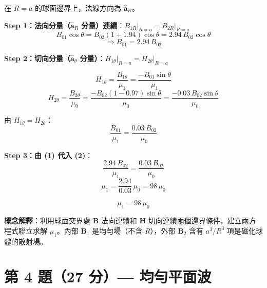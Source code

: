 \documentclass[12pt,a4paper]{article}
\newcommand{\vB}{\mathbf{B}}
\newcommand{\vH}{\mathbf{H}}
\newcommand{\aR}{\hat{\mathbf{a}}_R}
\newcommand{\ath}{\hat{\mathbf{a}}_\theta}
\begin{document}
\begin{solutionbox}[詳解]

在 $R = a$ 的球面邊界上，法線方向為 $\aR$。

\textbf{Step 1：法向分量（$\aR$ 分量）連續}：$B_{1R}\big|_{R=a} = B_{2R}\big|_{R=a}$
\[
  B_{01}\cos\theta = B_{02}\left(1 + 1.94\right)\cos\theta = 2.94\,B_{02}\cos\theta
\]
\[
  \Rightarrow B_{01} = 2.94\,B_{02}  \tag{1}
\]

\textbf{Step 2：切向分量（$\ath$ 分量）}：$H_{1\theta}\big|_{R=a} = H_{2\theta}\big|_{R=a}$

\[
  H_{1\theta} = \frac{B_{1\theta}}{\mu_1} = \frac{-B_{01}\sin\theta}{\mu_1}
\]
\[
  H_{2\theta} = \frac{B_{2\theta}}{\mu_0} = \frac{-B_{02}(1 - 0.97)\sin\theta}{\mu_0}
  = \frac{-0.03\,B_{02}\sin\theta}{\mu_0}
\]

由 $H_{1\theta} = H_{2\theta}$：
\[
  \frac{B_{01}}{\mu_1} = \frac{0.03\,B_{02}}{\mu_0} \tag{2}
\]

\textbf{Step 3：由 (1) 代入 (2)}：
\[
  \frac{2.94\,B_{02}}{\mu_1} = \frac{0.03\,B_{02}}{\mu_0}
\]
\[
  \mu_1 = \frac{2.94}{0.03}\,\mu_0 = 98\,\mu_0
\]

\[
  \boxed{\mu_1 = 98\,\mu_0}
\]

\textbf{概念解釋}：利用球面交界處 $\vB$ 法向連續和 $\vH$ 切向連續兩個邊界條件，建立兩方程式聯立求解 $\mu_1$。內部 $\vB_1$ 是均勻場（不含 $R$），外部 $\vB_2$ 含有 $a^3/R^3$ 項是磁化球體的散射場。
\end{solutionbox}

\section{第 4 題（27 分）— 均勻平面波}
\end{document}

